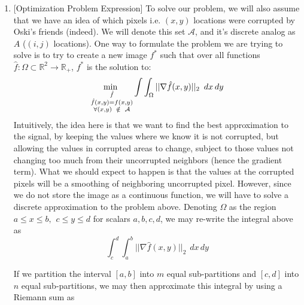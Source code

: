 \begin{enumerate}
    \item {[Optimization Problem Expression]}
    To solve our problem, we will also assume that we have an idea of which pixels i.e. $(x,y)$ locations were corrupted by Oski's friends (indeed). We will denote this set $\mathcal{A}$, and it's discrete analog as $A$ ($(i,j)$ locations). One way to formulate the problem we are trying to solve is to try to create a new image $f^{*}$ such that over all functions $\hat{f} \colon \Omega \subset  \mathbb{R}^{2}\to \mathbb{R}_{+}$, $f^{*}$ is the solution to:
    \begin{equation*}
          \underset{\begin{subarray}{c}
      \hat{f} \\
      \hat{f}(x,y) = f(x,y)\\
      \forall (x,y) \hspace{5pt} \notin \hspace{5pt} \mathcal{A}
      \end{subarray}}{\text{min }} \int \int_{\Omega} ||\nabla \hat{f}(x,y)||_2 \hspace{5pt}  dx \hspace{2pt} dy
    \end{equation*}
    Intuitively, the idea here is that we want to find the best approximation to the signal, by keeping the values where we know it is not corrupted, but allowing the values in corrupted areas to change, subject to those values not changing too much from their uncorrupted neighbors (hence the gradient term). What we should expect to happen is that the values at the corrupted pixels will be a smoothing of neighboring uncorrupted pixel. However, since we do not store the image as a continuous function, we will have to solve a discrete approximation to the problem above.
    \newline
    Denoting $\Omega$ as the region $a \leq x \leq b, \hspace{5pt} c \leq y \leq d$ for scalars $a,b,c,d$, we may re-write the integral above as 
    \begin{equation*}
        \int_{c}^{d} \int_{a}^{b} ||\nabla \hat{f}(x,y)||_2 \hspace{5pt}  dx \hspace{2pt} dy
    \end{equation*} 
    
    If we partition the interval $[a,b]$ into $m$ equal sub-partitions and $[c,d]$ into $n$ equal sub-partitions, we may then approximate this integral by using a Riemann sum as
    

\end{enumerate}
